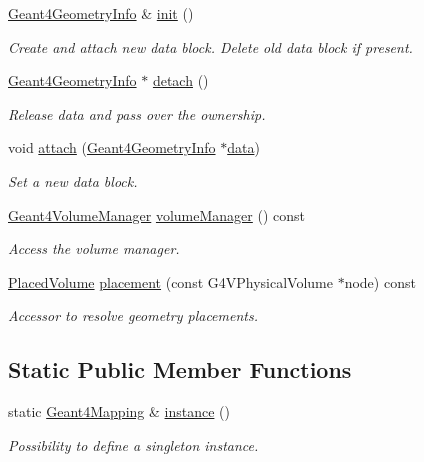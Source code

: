 \begin{DoxyCompactItemize}
\hyperlink{class_d_d4hep_1_1_simulation_1_1_geant4_geometry_info}{Geant4\+Geometry\+Info} \& \hyperlink{class_d_d4hep_1_1_simulation_1_1_geant4_mapping_a241f6e8f761d19caf370fe43fbf22015}{init} ()
\begin{DoxyCompactList}\small\item\em Create and attach new data block. Delete old data block if present. \end{DoxyCompactList}\item 
\hyperlink{class_d_d4hep_1_1_simulation_1_1_geant4_geometry_info}{Geant4\+Geometry\+Info} $\ast$ \hyperlink{class_d_d4hep_1_1_simulation_1_1_geant4_mapping_a9d02ac3bbf930ce7a07694a296eaa8a2}{detach} ()
\begin{DoxyCompactList}\small\item\em Release data and pass over the ownership. \end{DoxyCompactList}\item 
void \hyperlink{class_d_d4hep_1_1_simulation_1_1_geant4_mapping_a10366f0a203f866a02f9e550d7a9d950}{attach} (\hyperlink{class_d_d4hep_1_1_simulation_1_1_geant4_geometry_info}{Geant4\+Geometry\+Info} $\ast$\hyperlink{class_d_d4hep_1_1_simulation_1_1_geant4_mapping_a6a078e8ed49fe6741f932d8dc5d3acb5}{data})
\begin{DoxyCompactList}\small\item\em Set a new data block. \end{DoxyCompactList}\item 
\hyperlink{class_d_d4hep_1_1_simulation_1_1_geant4_volume_manager}{Geant4\+Volume\+Manager} \hyperlink{class_d_d4hep_1_1_simulation_1_1_geant4_mapping_a1109a515d9cbac6d58760b647e3272d2}{volume\+Manager} () const
\begin{DoxyCompactList}\small\item\em Access the volume manager. \end{DoxyCompactList}\item 
\hyperlink{class_d_d4hep_1_1_simulation_1_1_geant4_mapping_a2cad95da5f969a6b67fb6d6944549ad6}{Placed\+Volume} \hyperlink{class_d_d4hep_1_1_simulation_1_1_geant4_mapping_a833a8b3dcf5923684cfbf51fc4cc2eea}{placement} (const G4\+V\+Physical\+Volume $\ast$node) const
\begin{DoxyCompactList}\small\item\em Accessor to resolve geometry placements. \end{DoxyCompactList}\end{DoxyCompactItemize}
\subsection*{Static Public Member Functions}
\begin{DoxyCompactItemize}
\item 
static \hyperlink{class_d_d4hep_1_1_simulation_1_1_geant4_mapping}{Geant4\+Mapping} \& \hyperlink{class_d_d4hep_1_1_simulation_1_1_geant4_mapping_affbc609db47e67ea60b84e61a41c00b6}{instance} ()
\begin{DoxyCompactList}\small\item\em Possibility to define a singleton instance. \end{DoxyCompactList}\end{DoxyCompactItemize}
